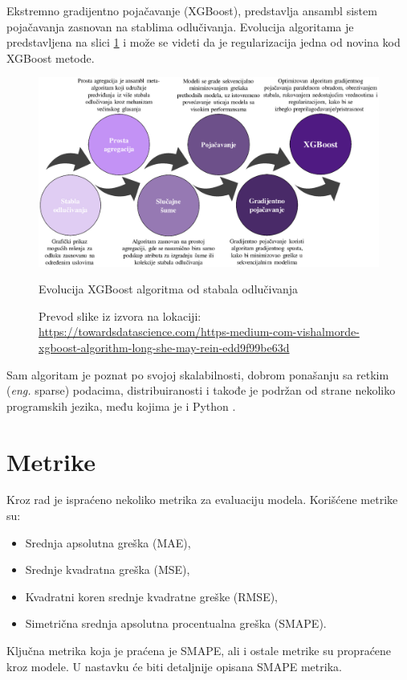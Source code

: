 \documentclass[12pt,oneside]{memoir}
\begin{document}
Ekstremno gradijentno pojačavanje (XGBoost), predstavlja ansambl sistem pojačavanja zasnovan na stablima odlučivanja. Evolucija algoritama je predstavljena na slici \ref{fig: xgboost_evolucija} i može se videti da je regularizacija jedna od novina kod XGBoost metode.
\begin{figure}[!ht]
  \centering
  \captionsetup{justification=centering}
  \includegraphics[width=1\textwidth]{./grafici/xgboost_evolucija_prevod.eps}
  \caption{Evolucija XGBoost algoritma od stabala odlučivanja}
  \vspace{-10pt}
  \caption*{\tiny{Prevod slike iz izvora na lokaciji: \url{https://towardsdatascience.com/https-medium-com-vishalmorde-xgboost-algorithm-long-she-may-rein-edd9f99be63d}}}
  \label{fig: xgboost_evolucija}
\end{figure}
Sam algoritam je poznat po svojoj skalabilnosti, dobrom ponašanju sa retkim (\textit{eng.} sparse) podacima, distribuiranosti i takođe je podržan od strane nekoliko programskih jezika, među kojima je i Python \cite{chen2016xgboost}.

\section{Metrike}
Kroz rad je ispraćeno nekoliko metrika za evaluaciju modela. Korišćene metrike su:
\begin{itemize}
    \item Srednja apsolutna greška (MAE),
    \item Srednje kvadratna greška (MSE),
    \item Kvadratni koren srednje kvadratne greške (RMSE),
    \item Simetrična srednja apsolutna procentualna greška (SMAPE).
\end{itemize}
Ključna metrika koja je praćena je SMAPE, ali i ostale metrike su propraćene kroz modele. U nastavku će biti detaljnije opisana SMAPE metrika.
\end{document}
